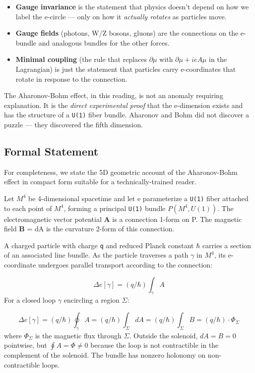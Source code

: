 \documentclass[aps,prd,preprint,superscriptaddress,longbibliography,floatfix]{revtex4-2}
\theoremstyle{remark}
\begin{document}
\begin{itemize}
  \item \textbf{Gauge invariance} is the statement that physics doesn't depend on how we label the e-circle --- only on how it \textit{actually rotates} as particles move.
  \item \textbf{Gauge fields} (photons, W/Z bosons, gluons) are the connections on the e-bundle and analogous bundles for the other forces.
  \item \textbf{Minimal coupling} (the rule that replaces $\partial\mu$ with $\partial\mu + ieA\mu$ in the Lagrangian) is just the statement that particles carry e-coordinates that rotate in response to the connection.
\end{itemize}

The Aharonov-Bohm effect, in this reading, is not an anomaly requiring explanation. It is the \textit{direct experimental proof} that the e-dimension exists and has the structure of a \texttt{U(1)} fiber bundle. Aharonov and Bohm did not discover a puzzle --- they discovered the fifth dimension.



\subsection{Formal Statement}

For completeness, we state the 5D geometric account of the Aharonov-Bohm effect in compact form suitable for a technically-trained reader.

Let $M^{4}$ be 4-dimensional spacetime and let e parameterize a \texttt{U(1)} fiber attached to each point of $M^{4}$, forming a principal \texttt{U(1)} bundle $P(M^{4}, U(1))$. The electromagnetic vector potential \textbf{A} is a connection 1-form on P. The magnetic field \textbf{B} = dA is the curvature 2-form of this connection.

A charged particle with charge \texttt{q} and reduced Planck constant $\hbar$ carries a section of an associated line bundle. As the particle traverses a path $\gamma$ in $M^{4}$, its e-coordinate undergoes parallel transport according to the connection:


\begin{equation}
    \Delta e[\gamma] = (q/\hbar) \int_\gamma A
\end{equation}
For a closed loop $\gamma$ encircling a region $\Sigma$:


\begin{equation}
    \Delta e[\gamma] = (q/\hbar) \oint_\gamma A = (q/\hbar) \int_\Sigma dA = (q/\hbar) \int_\Sigma B = (q/\hbar) \cdot \Phi_\Sigma
\end{equation}
where $\Phi_\Sigma$ is the magnetic flux through $\Sigma$. Outside the solenoid, $dA = B = 0$ pointwise, but $\oint A = \Phi \neq 0$ because the loop is not contractible in the complement of the solenoid. The bundle has nonzero holonomy on non-contractible loops.
\end{document}

